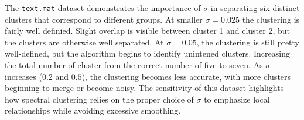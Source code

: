 \documentclass[11pt]{article}
\begin{document}
The \texttt{text.mat} dataset demonstrates the importance of \(\sigma\) in separating six distinct clusters that correspond to different groups. 
At smaller \(\sigma\)\(=\)\(0.025\) the clustering is fairly well definied. Slight overlap is visible between cluster 1 and cluster 2, but the clusters are otherwise well separated. 
At \(\sigma\)\(=\)\(0.05\), the clustering is still pretty well-defined, but the algorithm begins to identify unintened clusters. Increasing the total number of 
cluster from the correct number of five to seven. As \(\sigma\) increases (\(0.2\) and \(0.5\)), the clustering becomes less accurate, with more clusters beginning to merge or become noisy. 
The sensitivity of this dataset highlights how spectral clustering relies on the proper choice of \(\sigma\) to emphasize local relationships while avoiding excessive smoothing.\\
\end{document}
